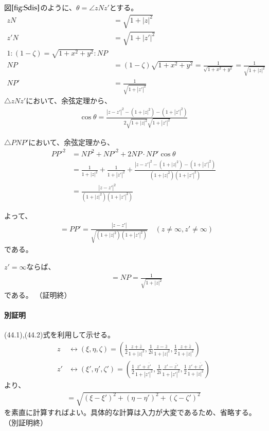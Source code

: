 図$\ref{fig:Sdis}$のように、$\theta=\angle zNz'$とする。
\begin{align*}
    zN&=\sqrt{1+|z|^2}\\
    z'N&=\sqrt{1+|z'|^2}\\
    1:(1-\zeta)=\sqrt{1+x^2+y^2}:NP\\
    NP&=(1-\zeta)\sqrt{1+x^2+y^2}=\frac{1}{\sqrt{1+x^2+y^2}}=\frac{1}{\sqrt{1+|z|^2}}\\
    NP'&=\frac{1}{\sqrt{1+|z'|^2}}
\end{align*}
$\triangle zNz'$において、余弦定理から、
\begin{align*}
    \cos\theta=\frac{|z-z'|^2-(1+|z|^2)-(1+|z'|^2)}{2\sqrt{1+|z|^2}\sqrt{1+|z'|^2}}
\end{align*}

$\triangle PNP'$において、余弦定理から、
\begin{align*}
    PP'^2
    &=NP^2+NP'^2+2NP\cdot NP'\cos\theta\\
    &=\frac{1}{1+|z|^2}+\frac{1}{1+|z'|^2}+\frac{|z-z'|^2-(1+|z|^2)-(1+|z'|^2)}{(1+|z|^2)(1+|z'|^2)}\\
    &=\frac{|z-z'|^2}{(1+|z|^2)(1+|z'|^2)}
\end{align*}

よって、
\begin{align*}
    [z,z']&=PP'=\frac{|z-z'|}{\sqrt{(1+|z|^2)(1+|z'|^2)}}
    \quad(z\neq\infty,z'\neq\infty)
\end{align*}
である。

$z'=\infty$ならば、
\begin{align*}
    [z,z']&=NP=\frac{1}{\sqrt{1+|z|^2}}
\end{align*}
である。
（証明終）

\paragraph{別証明}
(44.1),(44.2)式を利用して示せる。
\begin{align*}
    z&\leftrightarrow(\xi,\eta,\zeta)
    =\left(\frac{1}{2}\frac{z+\overline{z}}{1+|z|^2},\frac{1}{2i}\frac{z-\overline{z}}{1+|z|^2},\frac{1}{2}\frac{z+\overline{z}}{1+|z|^2}\right)\\
    z'&\leftrightarrow(\xi',\eta',\zeta')
    =\left(\frac{1}{2}\frac{z'+\overline{z'}}{1+|z'|^2},\frac{1}{2i}\frac{z'-\overline{z'}}{1+|z'|^2},\frac{1}{2}\frac{z'+\overline{z'}}{1+|z|^2}\right)
\end{align*}
より、
\begin{align*}
    [z,z']=\sqrt{(\xi-\xi')^2+(\eta-\eta')^2+(\zeta-\zeta')^2}
\end{align*}
を素直に計算すればよい。具体的な計算は入力が大変であるため、省略する。（別証明終）


